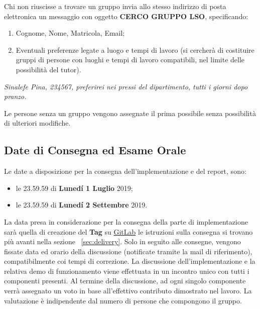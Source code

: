 Chi non riuscisse a trovare un gruppo invia allo stesso indirizzo di posta
elettronica un messaggio con oggetto \textbf{CERCO GRUPPO LSO}, specificando:

\begin{enumerate}

 \item Cognome, Nome, Matricola, Email;

 \item Eventuali preferenze legate a luogo e tempi di lavoro (si cercherà di
       costituire gruppi di persone con luoghi e tempi di lavoro compatibili, nel
       limite delle possibilità del tutor).

\end{enumerate}

\begin{tcolorbox}[colback=green!20!white,colframe=green!75!black,title=Email di esempio con oggetto \textbf{CERCO GRUPPO LSO}]
 \textit{Sinalefe Pina, 234567, preferirei nei pressi del dipartimento, tutti i giorni dopo pranzo.}
\end{tcolorbox}

Le persone senza un gruppo vengono assegnate il prima possibile senza
possibilità di ulteriori modifiche.

\subsection{Date di Consegna ed Esame Orale}

Le date a disposizione per la consegna dell'implementazione e del report, sono:

\begin{itemize}
 \item le 23.59.59 di \textbf{Lunedí 1 Luglio} 2019;
 \item le 23.59.59 di \textbf{Lunedí 2 Settembre} 2019.
\end{itemize}

La data presa in considerazione per la consegna della parte di implementazione
sarà quella di creazione del \textbf{Tag} su \href{https://gitlab.com}{GitLab}
le istruzioni sulla consegna si trovano più avanti nella sezione
~\ref{sec:delivery}. Solo in seguito alle consegne, vengono fissate data ed
orario della discussione (notificate tramite la mail di riferimento),
compatibilmente coi tempi di correzione. La discussione dell'implementazione e
la relativa demo di funzionamento viene effettuata in un incontro unico con
tutti i componenti presenti. Al termine della discussione, ad ogni singolo
componente verrà assegnato un voto in base all'effettivo contributo dimostrato
nel lavoro. La valutazione è indipendente dal numero di persone che compongono
il gruppo.
